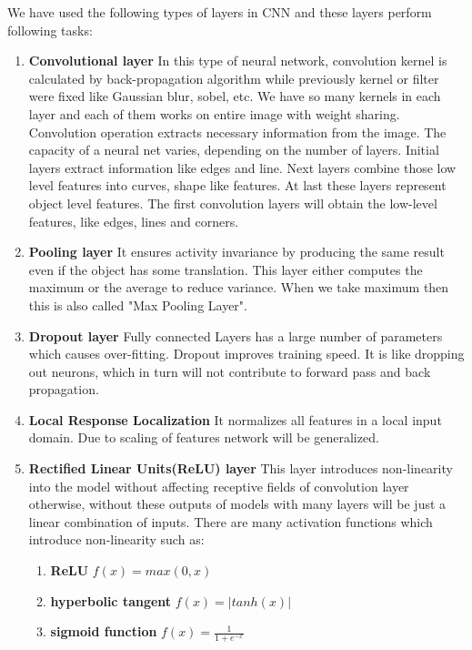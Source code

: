 \documentclass[11pt]{report}
\begin{document}
We have used the following types of layers in CNN and these layers perform following tasks:
\begin{enumerate}



\item \textbf{Convolutional layer}
In this type of neural network, convolution kernel is  calculated by back-propagation algorithm while previously kernel or filter were fixed like Gaussian blur, sobel, etc. We have so many kernels in each layer and each of them works on entire image with weight sharing. Convolution operation extracts necessary information from the image. The capacity of a neural net varies, depending on the number of layers. Initial layers extract information like edges and line. Next layers combine those low level features into curves, shape like features. At last these layers represent object level features. The first convolution layers will obtain the low-level features, like edges, lines and corners. 



\item \textbf{Pooling layer}
It ensures activity invariance by producing the same result even if the object has some translation. This layer either computes the maximum or the average to reduce variance. When we take maximum then this is also called "Max Pooling Layer".

\item \textbf{Dropout layer}
Fully connected Layers has a large number of parameters which  causes over-fitting. Dropout improves training speed. It is like dropping out neurons, which in turn will not contribute to forward pass and back propagation.

\item \textbf{Local Response Localization}
It normalizes all features in a local input domain. Due to scaling of features network will be generalized.

\item \textbf{Rectified Linear Units(ReLU) layer}
This layer introduces non-linearity into the model without affecting receptive fields of convolution layer otherwise, without these outputs of models with many layers will be just a linear combination of inputs.
There are many activation functions which introduce non-linearity such as:
\begin{enumerate}
\item \textbf{ReLU} $ f(x) =  max(0,x)$
\item \textbf{hyperbolic tangent} $f(x) = |tanh(x)|$
\item \textbf{sigmoid function} $f(x)=\frac{1}{1+e^{-x}}$
\end{enumerate}


\end{enumerate}
\end{document}
